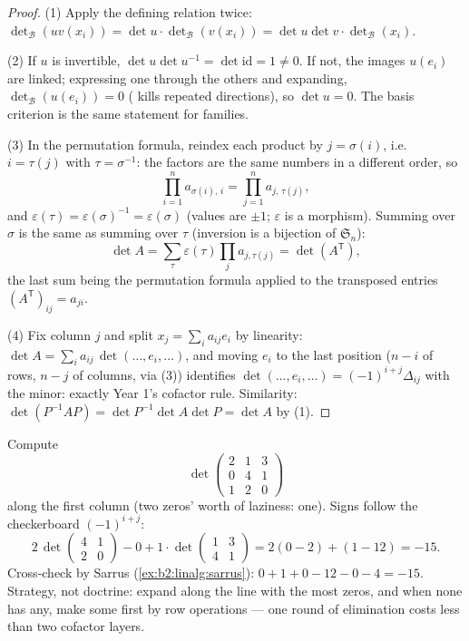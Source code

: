 \begin{proof}
(1) Apply the defining relation twice:
$\det_{\mathcal B}(uv(x_i)) = \det u \cdot \det_{\mathcal
B}(v(x_i)) = \det u \det v \cdot \det_{\mathcal B}(x_i)$.

(2) If $u$ is invertible, $\det u \det u^{-1} = \det \mathrm{id} =
1 \neq 0$. If not, the images $u(e_i)$ are linked; expressing one
through the others and expanding, $\det_{\mathcal B}(u(e_i)) = 0$
( kills repeated directions), so $\det u = 0$. The basis
criterion is the same statement for families.

(3) In the permutation formula, reindex each product by $j =
\sigma(i)$, i.e.\ $i = \tau(j)$ with $\tau = \sigma^{-1}$: the
factors are the same numbers in a different order, so
\[
\prod_{i=1}^{n} a_{\sigma(i),\,i} = \prod_{j=1}^{n}
a_{j,\,\tau(j)} ,
\]
and $\varepsilon(\tau) = \varepsilon(\sigma)^{-1} =
\varepsilon(\sigma)$ (values are $\pm1$; $\varepsilon$ is a
morphism). Summing over $\sigma$ is the same as summing over
$\tau$ (inversion is a bijection of $\mathfrak{S}_n$):
\[
\det A = \sum_{\tau}\varepsilon(\tau)\prod_j a_{j,\tau(j)}
= \det(A^{\mathsf T}),
\]
the last sum being the permutation formula applied to the
transposed entries $(A^{\mathsf T})_{ij} = a_{ji}$.

(4) Fix column $j$ and split $x_j = \sum_i a_{ij} e_i$ by
linearity: $\det A = \sum_i a_{ij}\, \det(\dots, e_i, \dots)$, and
moving $e_i$ to the last position ($n - i$  of rows,
$n - j$ of columns, via (3)) identifies $\det(\dots, e_i, \dots) =
(-1)^{i+j}\Delta_{ij}$ with the minor: exactly Year 1's cofactor
rule. Similarity: $\det(P^{-1}AP) = \det P^{-1}\det A \det P =
\det A$ by (1).
\end{proof}

\begin{example}\label{ex:b2:linalg:cofactorwork}
Compute
\[
\det\begin{pmatrix}
2 & 1 & 3\\
0 & 4 & 1\\
1 & 2 & 0
\end{pmatrix}
\]
along the first column (two zeros' worth of laziness: one).
Signs follow the checkerboard $(-1)^{i+j}$:
\[
2\,\det\begin{pmatrix}4 & 1\\ 2 & 0\end{pmatrix}
- 0
+ 1\cdot\det\begin{pmatrix}1 & 3\\ 4 & 1\end{pmatrix}
= 2(0 - 2) + (1 - 12) = -15 .
\]
Cross-check by Sarrus (\cref{ex:b2:linalg:sarrus}): $0 + 1 + 0
- 12 - 0 - 4 = -15$. Strategy, not doctrine: expand along the
line with the most zeros, and when none has any, make some
first by row operations --- one round of elimination costs
less than two cofactor layers.
\end{example}

